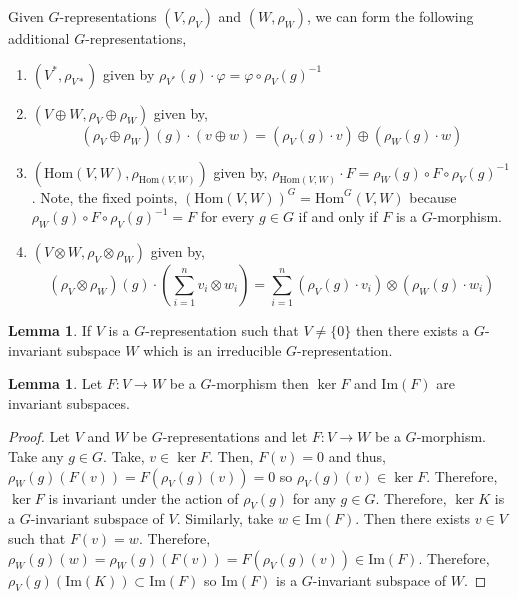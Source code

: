 \documentclass[12pt]{extarticle}
\renewcommand{\Im}[1]{\mathrm{Im}(#1)}
\newcommand{\Hom}[2]{\mathrm{Hom}\left( #1, #2 \right)}
\newcommand{\repHom}[3]{\mathrm{Hom}^{#1} \left( #2, #3 \right)}
\theoremstyle{definition}
\newtheorem{lemma}[theorem]{Lemma}
\newenvironment{definition}[1][Definition:]{\begin{trivlist}
\item[\hskip \labelsep {\bfseries #1}]}{\end{trivlist}}
\begin{document}
\begin{definition}
Given $G$-representations $(V, \rho_V)$ and $(W, \rho_W)$, we can form the following additional $G$-representations,
\begin{enumerate}
\item $(V^*, \rho_{V*})$ given by $\rho_{V^*}(g) \cdot \varphi = \varphi \circ \rho_V(g)^{-1}$

\item $(V \oplus W, \rho_V \oplus \rho_W)$ given by,
\[(\rho_V \oplus \rho_W) (g) \cdot (v \oplus w) = (\rho_V(g) \cdot v) \oplus (\rho_W(g) \cdot w)\]

\item $(\Hom{V}{W}, \rho_{\Hom{V}{W}})$ given by, $\rho_{\Hom{V}{W}} \cdot F = \rho_W(g) \circ F \circ \rho_V(g)^{-1}$. Note, the fixed points, $(\Hom{V}{W})^G = \repHom{G}{V}{W}$ because $\rho_W(g) \circ F \circ \rho_V(g)^{-1} = F$ for every $g \in G$ if and only if $F$ is a $G$-morphism. 

\item $(V \otimes W, \rho_V \otimes \rho_W)$ given by,
 \[(\rho_V \otimes \rho_W) (g) \cdot \left( \sum_{i = 1}^n v_i \otimes w_i \right) = \sum_{i = 1}^n (\rho_V(g) \cdot v_i) \otimes (\rho_W(g) \cdot w_i)\]

\end{enumerate}

\begin{lemma}
If $V$ is a $G$-representation such that $V \neq \{0\}$ then there exists a $G$-invariant subspace $W$ which is an irreducible $G$-representation. 
\end{lemma}

\begin{lemma}
Let $F : V \to W$ be a $G$-morphism then $\ker{F}$ and $\Im{F}$ are invariant subspaces.
\end{lemma}

\begin{proof}
Let $V$ and $W$ be $G$-representations and let $F : V \to W$ be a $G$-morphism. Take any $g \in G$. Take, $v \in \ker{F}$. Then, $F(v) = 0$ and thus, $\rho_W(g)(F(v)) = F(\rho_V(g)(v)) = 0$ so $\rho_V(g)(v) \in \ker{F}$. Therefore, $\ker{F}$ is invariant under the action of $\rho_V(g)$ for any $g \in G$. Therefore, $\ker{K}$ is a $G$-invariant subspace of $V$. Similarly, take $w \in \Im{F}$. Then there exists $v \in V$ such that $F(v) = w$. Therefore, $\rho_W(g)(w) = \rho_W(g)(F(v)) = F(\rho_V(g)(v)) \in \Im{F}$. Therefore, $\rho_V(g)(\Im{K}) \subset \Im{F}$ so $\Im{F}$ is a $G$-invariant subspace of $W$. 
\end{proof}


\end{definition}
\end{document}
